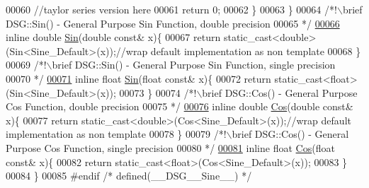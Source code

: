 \begin{DoxyCode}
00060             \textcolor{comment}{//taylor series version here}
00061             \textcolor{keywordflow}{return} 0;
00062         \}
00063     \}\textcolor{comment}{}
00064 \textcolor{comment}{    /*!\(\backslash\)brief DSG::Sin() - General Purpose Sin Function, double precision}
00065 \textcolor{comment}{     */}
\hypertarget{_sine_8h_source_l00066}{}\hyperlink{namespace_d_s_g_aad63d316081c7d13a551acf346ee2749}{00066}     \textcolor{keyword}{inline} \textcolor{keywordtype}{double} \hyperlink{namespace_d_s_g_aad63d316081c7d13a551acf346ee2749}{Sin}(\textcolor{keywordtype}{double} \textcolor{keyword}{const}& x)\{
00067         \textcolor{keywordflow}{return} \textcolor{keyword}{static\_cast<}\textcolor{keywordtype}{double}\textcolor{keyword}{>}(Sin<Sine\_Default>(x));\textcolor{comment}{//wrap default implementation as non template}
00068     \}\textcolor{comment}{}
00069 \textcolor{comment}{    /*!\(\backslash\)brief DSG::Sin() - General Purpose Sin Function, single precision}
00070 \textcolor{comment}{     */}
\hypertarget{_sine_8h_source_l00071}{}\hyperlink{namespace_d_s_g_aa2f9baa8896fff266c5e7ee73fb5c3d5}{00071}     \textcolor{keyword}{inline} \textcolor{keywordtype}{float} \hyperlink{namespace_d_s_g_aad63d316081c7d13a551acf346ee2749}{Sin}(\textcolor{keywordtype}{float} \textcolor{keyword}{const}& x)\{
00072         \textcolor{keywordflow}{return} \textcolor{keyword}{static\_cast<}\textcolor{keywordtype}{float}\textcolor{keyword}{>}(Sin<Sine\_Default>(x));
00073     \}\textcolor{comment}{}
00074 \textcolor{comment}{    /*!\(\backslash\)brief DSG::Cos() - General Purpose Cos Function, double precision}
00075 \textcolor{comment}{     */}
\hypertarget{_sine_8h_source_l00076}{}\hyperlink{namespace_d_s_g_ade303ad15c77f534429305c3cbd90191}{00076}     \textcolor{keyword}{inline} \textcolor{keywordtype}{double} \hyperlink{namespace_d_s_g_ade303ad15c77f534429305c3cbd90191}{Cos}(\textcolor{keywordtype}{double} \textcolor{keyword}{const}& x)\{
00077         \textcolor{keywordflow}{return} \textcolor{keyword}{static\_cast<}\textcolor{keywordtype}{double}\textcolor{keyword}{>}(Cos<Sine\_Default>(x));\textcolor{comment}{//wrap default implementation as non template}
00078     \}\textcolor{comment}{}
00079 \textcolor{comment}{    /*!\(\backslash\)brief DSG::Cos() - General Purpose Cos Function, single precision}
00080 \textcolor{comment}{     */}
\hypertarget{_sine_8h_source_l00081}{}\hyperlink{namespace_d_s_g_a214b00c1735dd1976757f284dfe6fb1f}{00081}     \textcolor{keyword}{inline} \textcolor{keywordtype}{float} \hyperlink{namespace_d_s_g_ade303ad15c77f534429305c3cbd90191}{Cos}(\textcolor{keywordtype}{float} \textcolor{keyword}{const}& x)\{
00082         \textcolor{keywordflow}{return} \textcolor{keyword}{static\_cast<}\textcolor{keywordtype}{float}\textcolor{keyword}{>}(Cos<Sine\_Default>(x));
00083     \}
00084 \}
00085 \textcolor{preprocessor}{#endif }\textcolor{comment}{/* defined(\_\_DSG\_\_Sine\_\_) */}\textcolor{preprocessor}{}
\end{DoxyCode}
